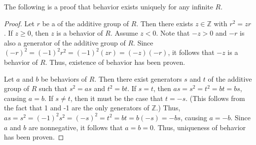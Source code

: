 \documentclass[12pt]{article}
\begin{document}

The following is a proof that behavior exists uniquely for any infinite  $R$.

\begin{proof}
Let $r$ be a  of the additive group of $R$.  Then there exists $z \in \mathbb{Z}$ with $r^2=zr$.  If $z \ge 0$, then $z$ is a behavior of $R$.  Assume $z<0$.  Note that $-z>0$ and $-r$ is also a generator of the additive group of $R$.  Since $(-r)^2=(-1)^2r^2=(-1)^2(zr)=(-z)(-r)$, it follows that $-z$ is a behavior of $R$.  Thus, existence of behavior has been proven.

Let $a$ and $b$ be behaviors of $R$.  Then there exist generators $s$ and $t$ of the additive group of $R$ such that $s^2=as$ and $t^2=bt$.  If $s=t$, then $as=s^2=t^2=bt=bs$, causing $a=b$.  If $s \neq t$, then it must be the case that $t=-s$.  (This follows from the fact that 1 and -1 are the only generators of $\mathbb{Z}$.)  Thus, $as=s^2=(-1)^2s^2=(-s)^2=t^2=bt=b(-s)=-bs$, causing $a=-b$.  Since $a$ and $b$ are nonnegative, it follows that $a=b=0$.  Thus, uniqueness of behavior has been proven.
\end{proof}
\end{document}
